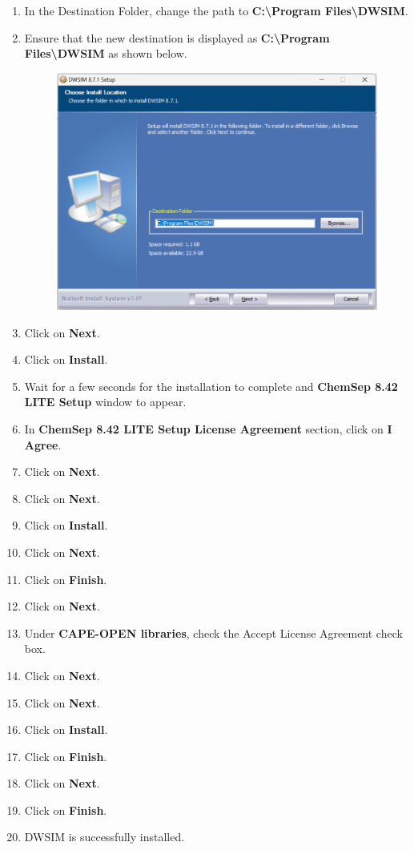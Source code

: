 \documentclass[a4paper,12pt]{article}
\begin{document}
\begin{enumerate}
\item In the Destination Folder, change the path to \textbf{C:\textbackslash Program Files\textbackslash DWSIM}.
\item Ensure that the new destination is displayed as \textbf{C:\textbackslash Program Files\textbackslash DWSIM} as shown below.

\begin{figure}[H]
	\centering
	\includegraphics[width=0.75\linewidth]{DWSIM-Location.png}
\end{figure}

\item Click on \textbf{Next}.
\item Click on \textbf{Install}.
\item Wait for a few seconds for the installation to complete and \textbf{ChemSep 8.42 LITE Setup} window to appear.
\item In \textbf{ChemSep 8.42 LITE Setup License Agreement} section, click on \textbf{I Agree}.
\item Click on \textbf{Next}.
\item Click on \textbf{Next}.
\item Click on \textbf{Install}.
\item Click on \textbf{Next}.
\item Click on \textbf{Finish}.
\item Click on \textbf{Next}.
\item Under \textbf{CAPE-OPEN libraries}, check the Accept License Agreement check box.
\item Click on \textbf{Next}.
\item Click on \textbf{Next}.
\item Click on \textbf{Install}.
\item Click on \textbf{Finish}.
\item Click on \textbf{Next}.
\item Click on \textbf{Finish}.
\item DWSIM is successfully installed.

\end{enumerate}
\end{document}
